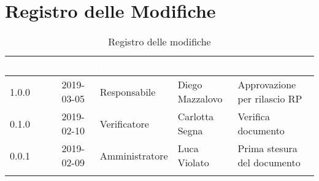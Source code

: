 \newpage

\section*{Registro delle Modifiche}

\begin{center}
\begin{longtable}[c]{|m{}|m{}|m{}|m{}|p{}|}
\hline
\rowcolor{bluelogo}\textbf{\textcolor{white}{Versione}} & \textbf{\textcolor{white}{Data}} & \textbf{\textcolor{white}{Ruolo}} & \textbf{\textcolor{white}{Autore}} & \textbf{\textcolor{white}{Descrizione}}\\
\endfirsthead
\hline \hline
1.0.0 & 2019-03-05 & Responsabile & Diego Mazzalovo & Approvazione per rilascio RP\\
\hline
\rowcolor{grigio} 0.1.0 & 2019-02-10 & Verificatore & Carlotta Segna & Verifica documento \\
\hline
0.0.1 & 2019-02-09 & Amministratore & Luca Violato & Prima stesura del documento\\
\hline
\caption{Registro delle modifiche}
\end{longtable}
\end{center}
